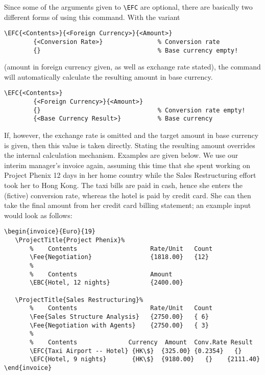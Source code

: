 \documentclass[11pt]{ltxdoc}
\begin{document}
Since some of the arguments given to \verb-\EFC- are optional,
there are basically two different forms of using this command.
With the variant

\begin{verbatim}
\EFC{<Contents>}{<Foreign Currency>}{<Amount>}
        {<Conversion Rate>}               % Conversion rate
        {}                                % Base currency empty!
\end{verbatim}

(amount in foreign currency given, as well as exchange rate stated),
the command will automatically calculate the resulting amount in
base currency.

\begin{verbatim}
\EFC{<Contents>}
        {<Foreign Currency>}{<Amount>}
        {}                                % Conversion rate empty!
        {<Base Currency Result>}          % Base currency
\end{verbatim}

If, however, the exchange rate is omitted and the target amount in
base currency is given, then this value is taken directly. Stating
the resulting amount overrides the internal calculation mechanism.
Examples are given below. We use our interim manager's invoice
again, assuming this time that she spent working on Project Phenix 
12 days in her home country while the Sales Restructuring effort
took her to Hong Kong. The taxi bills are paid in cash, hence she
enters the (fictive) conversion rate, whereas the hotel is paid by
credit card. She can then take the final amount from her credit card
billing statement; an example input would look as follows:

\begin{verbatim}
\begin{invoice}{Euro}{19}
   \ProjectTitle{Project Phenix}%
       %    Contents                    Rate/Unit   Count
       \Fee{Negotiation}                {1818.00}   {12}
       %
       %    Contents                    Amount
       \EBC{Hotel, 12 nights}           {2400.00}

   \ProjectTitle{Sales Restructuring}%
       %    Contents                    Rate/Unit   Count
       \Fee{Sales Structure Analysis}   {2750.00}   { 6}
       \Fee{Negotiation with Agents}    {2750.00}   { 3}
       %
       %    Contents              Currency  Amount  Conv.Rate Result
       \EFC{Taxi Airport -- Hotel} {HK\$}  {325.00} {0.2354}   {}
       \EFC{Hotel, 9 nights}       {HK\$}  {9180.00}   {}    {2111.40}
\end{invoice}
\end{verbatim}
\end{document}
